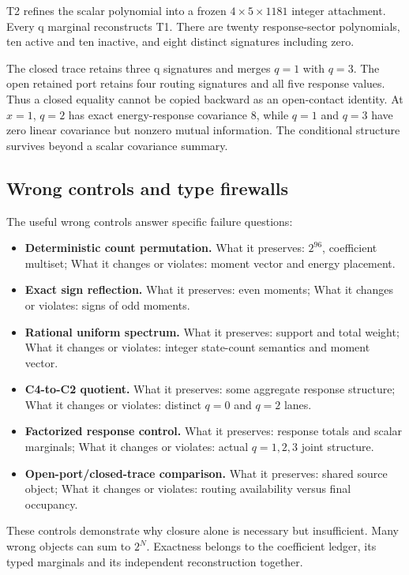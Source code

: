 T2 refines the scalar polynomial into a frozen \(4\times5\times1181\)
integer attachment. Every q marginal reconstructs T1. There are twenty
response-sector polynomials, ten active and ten inactive, and eight
distinct signatures including zero.

The closed trace retains three q signatures and merges \(q=1\) with
\(q=3\). The open retained port retains four routing signatures and all
five response values. Thus a closed equality cannot be copied backward
as an open-contact identity. At \(x=1\), \(q=2\) has exact
energy-response covariance 8, while \(q=1\) and \(q=3\) have zero linear
covariance but nonzero mutual information. The conditional structure
survives beyond a scalar covariance summary.

\subsection{Wrong controls and type
firewalls}\label{viii-ch03-wrong-controls-and-type-firewalls}

The useful wrong controls answer specific failure questions:

\begin{itemize}
\tightlist
\item
  \textbf{Deterministic count permutation.} What it preserves:
  \(2^{96}\), coefficient multiset; What it changes or violates: moment
  vector and energy placement.
\item
  \textbf{Exact sign reflection.} What it preserves: even moments; What
  it changes or violates: signs of odd moments.
\item
  \textbf{Rational uniform spectrum.} What it preserves: support and
  total weight; What it changes or violates: integer state-count
  semantics and moment vector.
\item
  \textbf{C4-to-C2 quotient.} What it preserves: some aggregate response
  structure; What it changes or violates: distinct \(q=0\) and \(q=2\)
  lanes.
\item
  \textbf{Factorized response control.} What it preserves: response
  totals and scalar marginals; What it changes or violates: actual
  \(q=1,2,3\) joint structure.
\item
  \textbf{Open-port/closed-trace comparison.} What it preserves: shared
  source object; What it changes or violates: routing availability
  versus final occupancy.
\end{itemize}

These controls demonstrate why closure alone is necessary but
insufficient. Many wrong objects can sum to \(2^N\). Exactness belongs
to the coefficient ledger, its typed marginals and its independent
reconstruction together.

